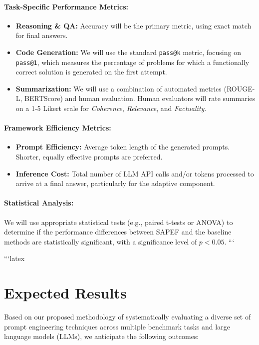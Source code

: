 \documentclass{article}
\begin{document}
\paragraph{Task-Specific Performance Metrics:}
\begin{itemize}
    \item \textbf{Reasoning \& QA:} Accuracy will be the primary metric, using exact match for final answers.
    \item \textbf{Code Generation:} We will use the standard \texttt{pass@k} metric, focusing on \texttt{pass@1}, which measures the percentage of problems for which a functionally correct solution is generated on the first attempt.
    \item \textbf{Summarization:} We will use a combination of automated metrics (ROUGE-L, BERTScore) and human evaluation. Human evaluators will rate summaries on a 1-5 Likert scale for \textit{Coherence}, \textit{Relevance}, and \textit{Factuality}.
\end{itemize}

\paragraph{Framework Efficiency Metrics:}
\begin{itemize}
    \item \textbf{Prompt Efficiency:} Average token length of the generated prompts. Shorter, equally effective prompts are preferred.
    \item \textbf{Inference Cost:} Total number of LLM API calls and/or tokens processed to arrive at a final answer, particularly for the adaptive component.
\end{itemize}

\paragraph{Statistical Analysis:}
We will use appropriate statistical tests (e.g., paired t-tests or ANOVA) to determine if the performance differences between SAPEF and the baseline methods are statistically significant, with a significance level of $p < 0.05$.
```

```latex
\section{Expected Results}

Based on our proposed methodology of systematically evaluating a diverse set of prompt engineering techniques across multiple benchmark tasks and large language models (LLMs), we anticipate the following outcomes:
\end{document}
